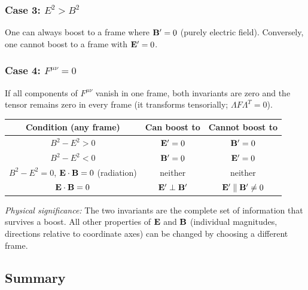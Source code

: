 \subsubsection*{Case 3: $E^2>B^2$}
One can always boost to a frame where $\mathbf{B}'=0$ (purely electric field).  Conversely, one cannot
boost to a frame with $\mathbf{E}'=0$.

\subsubsection*{Case 4: $F^{\mu\nu}=0$}
If all components of $F^{\mu\nu}$ vanish in one frame, both invariants are zero and the tensor
remains zero in every frame (it transforms tensorially; $\Lambda F\Lambda^T=0$).

\begin{center}
\renewcommand{\arraystretch}{1.3}
\begin{tabular}{ccc}
  \toprule
  Condition (any frame) & Can boost to & Cannot boost to \\
  \midrule
  $B^2-E^2>0$ & $\mathbf{E}'=0$ & $\mathbf{B}'=0$ \\
  $B^2-E^2<0$ & $\mathbf{B}'=0$ & $\mathbf{E}'=0$ \\
  $B^2-E^2=0$, $\mathbf{E}\cdot\mathbf{B}=0$ (radiation) & neither & neither \\
  $\mathbf{E}\cdot\mathbf{B}=0$ & $\mathbf{E}'\perp\mathbf{B}'$ & $\mathbf{E}'\parallel\mathbf{B}'\neq 0$ \\
  \bottomrule
\end{tabular}
\end{center}

\textit{Physical significance:} The two invariants are the complete set of information that survives
a boost.  All other properties of $\mathbf{E}$ and $\mathbf{B}$ (individual magnitudes, directions relative to
coordinate axes) can be changed by choosing a different frame.

\subsection*{Summary}

